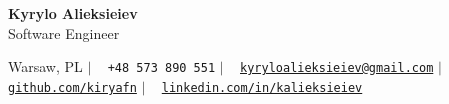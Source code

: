 \begin{center}
    {\bfseries\fontsize{26}{30}\selectfont Kyrylo Alieksieiev} \\ \vspace{5pt}
    {\fontsize{16}{20}\selectfont Software Engineer} \\ \vspace{5pt}
    \footnotesize

    \hspace{1pt} Warsaw, PL \hspace{1pt} $|$
    {\faPhone\ } \texttt{+48 573 890 551} \hspace{1pt} $|$
    \hspace{1pt} {\faEnvelope\ } \href{mailto:kyryloalieksieiev@gmail.com}{\texttt{kyryloalieksieiev@gmail.com}} \hspace{1pt} $|$
    \hspace{1pt} {\faGithub\ } \href{https://github.com/kiryafn}{\texttt{github.com/kiryafn}} \hspace{1pt} $|$
    \hspace{1pt} {\faLinkedin\ } \href{https://linkedin.com/in/kalieksieiev}{\texttt{linkedin.com/in/kalieksieiev}}
    \\ \vspace{-3pt}
\end{center}
